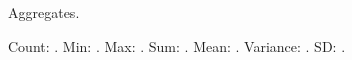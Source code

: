 \documentclass{article}
\begin{document}
Aggregates.


Count: .
Min: .
Max: .
Sum: .
Mean: .
Variance: .
SD: .
\end{document}
